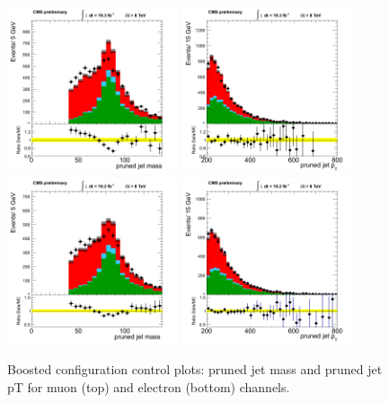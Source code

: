 \begin{figure}[htbp]
\centering
\includegraphics[width=0.45\textwidth]{figs/n-1_plots_mu/mu_GroomedJet_mass.png}
\includegraphics[width=0.45\textwidth]{figs/n-1_plots_mu/mu_GroomedJet_pt_pr.png}\\
\includegraphics[width=0.45\textwidth]{figs/n-1_plots_el/el_GroomedJet_mass.png}
\includegraphics[width=0.45\textwidth]{figs/n-1_plots_el/el_GroomedJet_pt_pr.png}\\
\caption{Boosted configuration control plots: pruned jet mass and pruned jet pT for muon (top) and electron (bottom) channels.}
\label{fig:control_boosted_jet}
\end{figure}

